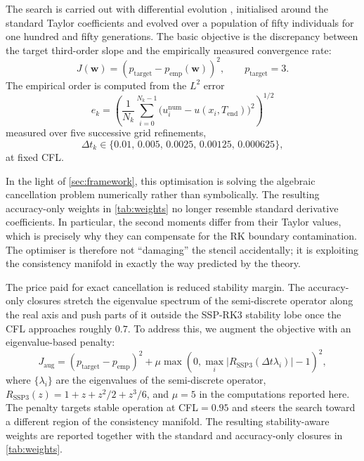 \documentclass[review,hidelinks,onefignum,onetabnum]{siamart251216}
\newcommand{\Dt}{\Delta t}
\begin{document}
The search is carried out with differential evolution \cite{StornPrice1997}, initialised around the standard Taylor coefficients and evolved over a population of fifty individuals for one hundred and fifty generations. The basic objective is the discrepancy between the target third-order slope and the empirically measured convergence rate:
\begin{equation}
  J(\mathbf w)=\left(p_{\mathrm{target}}-p_{\mathrm{emp}}(\mathbf w)\right)^2,
  \qquad p_{\mathrm{target}}=3.
  \label{eq:cost}
\end{equation}
The empirical order is computed from the $L^2$ error
\begin{equation}
  e_k = \left(\frac{1}{N_k}\sum_{i=0}^{N_k-1}
  \bigl(u_i^{\mathrm{num}}-u(x_i,T_{\mathrm{end}})\bigr)^2\right)^{1/2}
  \label{eq:l2err}
\end{equation}
measured over five successive grid refinements,
\[
\Dt_k\in\{0.01,\,0.005,\,0.0025,\,0.00125,\,0.000625\},
\]
at fixed CFL.

In the light of \cref{sec:framework}, this optimisation is solving the algebraic cancellation problem numerically rather than symbolically. The resulting accuracy-only weights in \cref{tab:weights} no longer resemble standard derivative coefficients. In particular, the second moments differ from their Taylor values, which is precisely why they can compensate for the RK boundary contamination. The optimiser is therefore not ``damaging'' the stencil accidentally; it is exploiting the consistency manifold in exactly the way predicted by the theory.

The price paid for exact cancellation is reduced stability margin. The accuracy-only closures stretch the eigenvalue spectrum of the semi-discrete operator along the real axis and push parts of it outside the SSP-RK3 stability lobe once the CFL approaches roughly $0.7$. To address this, we augment the objective with an eigenvalue-based penalty:
\begin{equation}
  J_{\mathrm{aug}}
  = \left(p_{\mathrm{target}}-p_{\mathrm{emp}}\right)^2
  + \mu \max\!\left(0,\max_i |R_{\mathrm{SSP3}}(\Dt\lambda_i)|-1\right)^2,
  \label{eq:cost-aug}
\end{equation}
where $\{\lambda_i\}$ are the eigenvalues of the semi-discrete operator, $R_{\mathrm{SSP3}}(z)=1+z+z^2/2+z^3/6$, and $\mu=5$ in the computations reported here. The penalty targets stable operation at CFL$=0.95$ and steers the search toward a different region of the consistency manifold. The resulting stability-aware weights are reported together with the standard and accuracy-only closures in \cref{tab:weights}.
\end{document}
